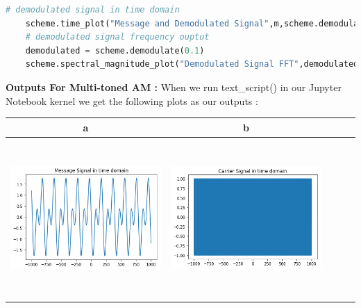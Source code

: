 \documentclass[12pt,a4paper]{article}%
\begin{document}
\begin{flushleft}
\begin{lstlisting}[language=python]
	# demodulated signal in time domain
	scheme.time_plot("Message and Demodulated Signal",m,scheme.demodulate(0.1)/16.0)
	# demodulated signal frequency ouptut
	demodulated = scheme.demodulate(0.1)
	scheme.spectral_magnitude_plot("Demodulated Signal FFT",demodulated)
   \end{lstlisting}
   \pagebreak
   \large\textbf{Outputs For Multi-toned AM : }
   \small When we run text\_script() in our Jupyter Notebook kernel we get the following plots as our outputs :\\\bigskip
   \begin{tabular}{ccccc}
   	\toprule
   	 a & b \\
   	\midrule
   	 {\includegraphics[width=6cm,height=6cm]{./images/m_sig1.PNG}} & {\includegraphics[width=6cm,height=6cm]{./images/c_sig1.PNG}}  \\

\end{tabular}
\end{flushleft}
\end{document}
